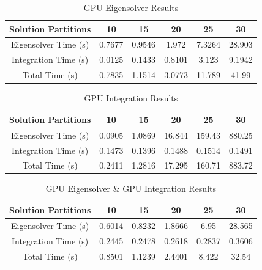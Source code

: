 \documentclass[conference, twoside]{IEEEtran}
\begin{document}
\begin{table}
    \renewcommand{\arraystretch}{1.3} %
    \caption{GPU Eigensolver Results}
    \label{gpu-eigensolver-results}
    \centering
    \begin{tabular}{c||c|c|c|c|c}
        \hline
        {Solution Partitions} & {10} & {15} & {20} & {25} & {30} \\
        \hline
        \hline
        {Eigensolver Time (s)}              & {0.7677} & {0.9546} & {1.972}  & {7.3264} & {28.903}\\
        {Integration Time (s)}              & {0.0125} & {0.1433} & {0.8101} & {3.123}  & {9.1942}\\
        {Total Time (s)}                    & {0.7835} & {1.1514} & {3.0773} & {11.789} & {41.99} \\
        \hline
    \end{tabular}
\end{table}

\begin{table}
    \renewcommand{\arraystretch}{1.3} %
    \caption{GPU Integration Results}
    \label{gpu-integration-results}
    \centering
    \begin{tabular}{c||c|c|c|c|c}
        \hline
        {Solution Partitions} & {10} & {15} & {20} & {25} & {30} \\
        \hline
        \hline
        {Eigensolver Time (s)}              & {0.0905} & {1.0869} & {16.844} & {159.43} & {880.25}\\
        {Integration Time (s)}              & {0.1473} & {0.1396} & {0.1488} & {0.1514} & {0.1491}\\
        {Total Time (s)}                    & {0.2411} & {1.2816} & {17.295} & {160.71} & {883.72}\\
        \hline
    \end{tabular}
\end{table}

\begin{table}
    \renewcommand{\arraystretch}{1.3} %
    \caption{GPU Eigensolver \& GPU Integration Results}
    \label{gpu-eigensolver-and-integration-results}
    \centering
    \begin{tabular}{c||c|c|c|c|c}
        \hline
        {Solution Partitions} & {10} & {15} & {20} & {25} & {30} \\
        \hline
        \hline
        {Eigensolver Time (s)}              & {0.6014} & {0.8232} & {1.8666} & {6.95}   & {28.565}\\
        {Integration Time (s)}              & {0.2445} & {0.2478} & {0.2618} & {0.2837} & {0.3606}\\
        {Total Time (s)}                    & {0.8501} & {1.1239} & {2.4401} & {8.422}  & {32.54} \\
        \hline
    \end{tabular}
\end{table}
\end{document}
